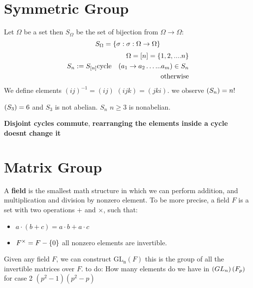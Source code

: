 \section{Symmetric Group}
Let $ \Omega $ be a set then $S_{\Omega} $ be the set of bijection from $\Omega \rightarrow \Omega$:
\[ S_{\Omega} = \left\lbrace \sigma: \sigma: \Omega \rightarrow \Omega  \right\rbrace \]
\begin{align*}
\Omega = [n] = \left\lbrace 1,2,....n \right\rbrace \\
S_n : = S_{[n]}
\textrm{cycle} \quad (a_1 \rightarrow a_2 \ldots ... a_m ) \in S_n \\
\textrm{otherwise} 
\end{align*}
We define elements $(i j)^{-1} = (ij) $ $(ijk)=(jki) $.
we observe  $ \left( S_n \right) = n! $ 
\begin{example}
	$ \left( S_3 \right) = 6 $ and $S_3$ is not abelian. $S_n$ $ n \geq 3$ is nonabelian.
\end{example}
\textbf{Disjoint cycles commute}, \textbf{rearranging the elements inside a cycle doesnt change it}

\section*{Matrix Group}

\begin{define}
	A \textbf{field} is the smallest math structure in which we can perform addition, and multiplication and division by nonzero element. To be more precise, a field $F$ is a set with two operations $+$ and $ \times $, such that:
	\begin{itemize}
		\item $ a \cdot ( b + c ) = a \cdot b + a \cdot c$
		\item $F^{\times} = F - \left\lbrace 0 \right\rbrace $ all nonzero elements are invertible.  
	\end{itemize}
\end{define}
Given any field $F$, we can construct $\operatorname{GL_n}(F)$ this is the group of all the invertible matrices over $F$.
to do: How many elements do we have in $ \left( GL_n \right)(F_p) $ for case 2 $(p^2 -1)(p^2 - p) $